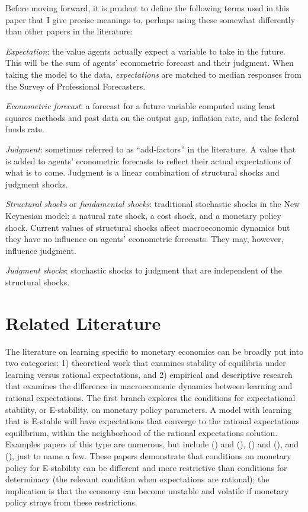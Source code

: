 \documentclass[10pt]{article}
\newcommand{\bd}{\begin{description}}
\newcommand{\ed}{\end{description}}
\newcommand{\citee}[1]{\citeauthor*{#1} (\citeyear{#1})}
\begin{document}
Before moving forward, it is prudent to define the following terms used in this paper that I give precise meanings to, perhaps using these somewhat differently than other papers in the literature:
\bd
\item \textit{Expectation}: the value agents actually expect a variable to take in the future.  This will be the sum of agents' econometric forecast and their judgment.  When taking the model to the data, \textit{expectations} are matched to median responses from the Survey of Professional Forecasters.
\item \textit{Econometric forecast}: a forecast for a future variable computed using least squares methods and past data on the output gap, inflation rate, and the federal funds rate.
\item \textit{Judgment}: sometimes referred to as ``add-factors'' in the literature.  A value that is added to agents' econometric forecasts to reflect their actual expectations of what is to come.  Judgment is a linear combination of structural shocks and judgment shocks.  
\item \textit{Structural shocks} or \textit{fundamental shocks}: traditional stochastic shocks in the New Keynesian model: a natural rate shock, a cost shock, and a monetary policy shock.  Current values of structural shocks affect macroeconomic dynamics but they have no influence on agents' econometric forecasts.  They may, however, influence judgment.
\item \textit{Judgment shocks}: stochastic shocks to judgment that are independent of the structural shocks.
\ed

\section{Related Literature}

The literature on learning specific to monetary economics can be broadly put into two categories: 1) theoretical work that examines stability of equilibria under learning versus rational expectations, and 2) empirical and descriptive research that examines the difference in macroeconomic dynamics between learning and rational expectations.  The first branch explores the conditions for expectational stability, or E-stability, on monetary policy parameters.  A model with learning that is E-stable will have expectations that converge to the rational expectations equilibrium, within the neighborhood of the rational expectations solution.  Examples papers of this type are numerous, but include \citeauthor*{bullardmitra2002} (\citeyear{bullardmitra2002}) and (\citeyear{bullardmitra2007}), \citeauthor*{eh2003} (\citeyear{eh2003b}) and (\citeyear{eh2003}), and \citee{preston2005}, just to name a few.  These papers demonstrate that conditions on monetary policy for E-stability can be different and more restrictive than conditions for determinacy (the relevant condition when expectations are rational); the implication is that the economy can become unstable and volatile if monetary policy strays from these restrictions.
\end{document}
